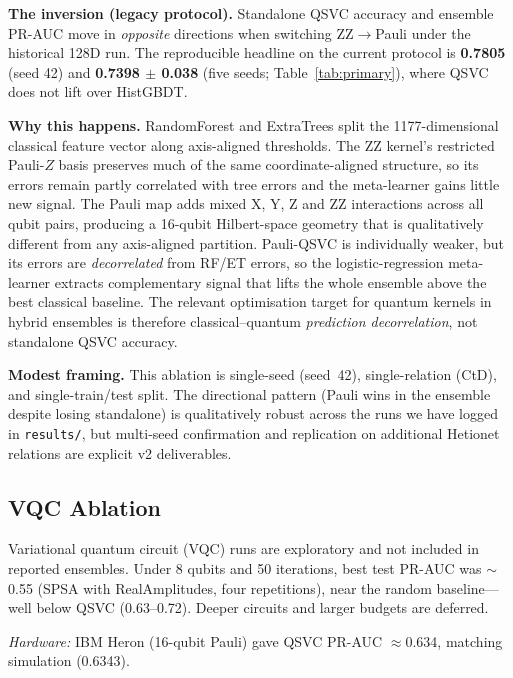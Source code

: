 \documentclass[10pt,twocolumn]{article}
\begin{document}
\noindent\textbf{The inversion (legacy protocol).} Standalone QSVC accuracy and ensemble PR-AUC move in \emph{opposite} directions when switching ZZ$\to$Pauli under the historical 128D run. The reproducible headline on the current protocol is \textbf{0.7805} (seed 42) and \textbf{0.7398 $\pm$ 0.038} (five seeds; Table~\ref{tab:primary}), where QSVC does not lift over HistGBDT.

\noindent\textbf{Why this happens.} RandomForest and ExtraTrees split the 1177-dimensional classical feature vector along axis-aligned thresholds. The ZZ kernel's restricted Pauli-$Z$ basis preserves much of the same coordinate-aligned structure, so its errors remain partly correlated with tree errors and the meta-learner gains little new signal. The Pauli map adds mixed X, Y, Z and ZZ interactions across all qubit pairs, producing a 16-qubit Hilbert-space geometry that is qualitatively different from any axis-aligned partition. Pauli-QSVC is individually weaker, but its errors are \emph{decorrelated} from RF/ET errors, so the logistic-regression meta-learner extracts complementary signal that lifts the whole ensemble above the best classical baseline. The relevant optimisation target for quantum kernels in hybrid ensembles is therefore classical--quantum \emph{prediction decorrelation}, not standalone QSVC accuracy.

\noindent\textbf{Modest framing.} This ablation is single-seed (seed~42), single-relation (CtD), and single-train/test split. The directional pattern (Pauli wins in the ensemble despite losing standalone) is qualitatively robust across the runs we have logged in \texttt{results/}, but multi-seed confirmation and replication on additional Hetionet relations are explicit v2 deliverables.

\subsection{VQC Ablation}

Variational quantum circuit (VQC) \cite{qiskit_vqc2023} runs are exploratory and not included in reported ensembles. Under 8 qubits and 50 iterations, best test PR-AUC was ${\sim}$0.55 (SPSA with RealAmplitudes, four repetitions), near the random baseline---well below QSVC (0.63--0.72). Deeper circuits and larger budgets are deferred.

\noindent\textit{Hardware:} IBM Heron (16-qubit Pauli) gave QSVC PR-AUC ${\approx}$0.634, matching simulation (0.6343).

\end{document}
